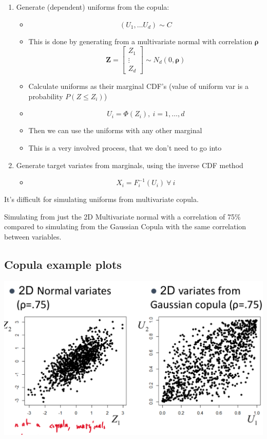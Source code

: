 \documentclass[
  oneside]{book}
\providecommand{\tightlist}{%
  \setlength{\itemsep}{0pt}\setlength{\parskip}{0pt}}
\begin{document}
\begin{enumerate}
\def\labelenumi{\arabic{enumi}.}
\tightlist
\item
  Generate (dependent) uniforms from the copula:

  \begin{itemize}
  \tightlist
  \item
    \[
    (U_{1},\dots U_{d}) \sim C
    \]
  \item
    This is done by generating from a multivariate normal with correlation \(\boldsymbol{\rho}\)
    \[
    \mathbf{Z} = \left[ \begin{array}{l}
    Z_{1} \\
    \vdots \\
    Z_{d}
    \end{array} \right] \sim N_{d}(0,\boldsymbol{\rho})
    \]
  \item
    Calculate uniforms as their marginal CDF's (value of uniform var is a probability \(P(Z \leq Z_{i})\))
  \item
    \[
    U_{i}=\Phi(Z_{i}), \ i=1,\dots,d
    \]
  \item
    Then we can use the uniforms with any other marginal
  \item
    This is a very involved process, that we don't need to go into
  \end{itemize}
\item
  Generate target variates from marginals, using the inverse CDF method

  \begin{itemize}
  \tightlist
  \item
    \[
    X_{i} = F_{i}^{-1}(U_{i}) \ \forall \ i
    \]
  \end{itemize}
\end{enumerate}

It's difficult for simulating uniforms from multivariate copula.

Simulating from just the 2D Multivariate normal with a correlation of 75\% compared to simulating from the Gaussian Copula with the same correlation between variables.

\hypertarget{copula-example-plots}{%
\subsection{Copula example plots}\label{copula-example-plots}}

\includegraphics{Notes/Obsidian-Attachments/4-Multivariate-Return-Modelling-3.png}
\end{document}
